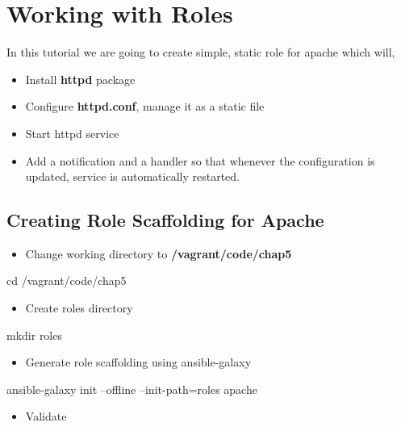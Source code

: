 \chapter{Working with Roles}

In this tutorial we are going to create simple, static role for apache which will,

\begin{itemize}
\item Install \textbf{httpd} package
\item Configure \textbf{httpd.conf}, manage it as a static file
\item Start httpd service
\item Add a notification and a  handler so that whenever the configuration is updated, service is automatically restarted.
\end{itemize}

\section{Creating Role Scaffolding for Apache}

\begin{itemize}
\item Change working  directory to \textbf{/vagrant/code/chap5}
\end{itemize}

\begin{code}
cd  /vagrant/code/chap5
\end{code}

\begin{itemize}
\item Create roles directory
\end{itemize}

\begin{code}
mkdir roles
\end{code}

\begin{itemize}
\item Generate role scaffolding using ansible-galaxy
\end{itemize}

\begin{code}
ansible-galaxy init --offline --init-path=roles  apache
\end{code}

\begin{itemize}
\item Validate
\end{itemize}

